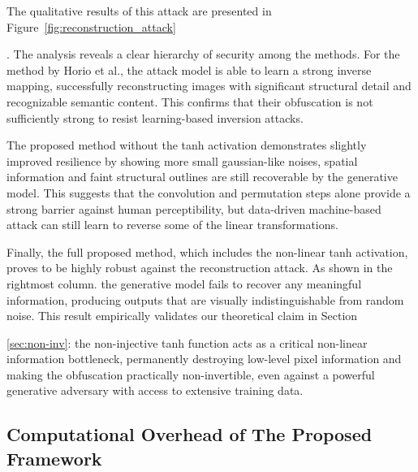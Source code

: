 \documentclass{ieeeaccess}
\begin{document}
{The qualitative results of this attack are presented in Figure~}\ref{fig:reconstruction_attack}{. The analysis reveals a clear hierarchy of security among the methods. For the method by Horio et al., the attack model is able to learn a strong inverse mapping, successfully reconstructing images with significant structural detail and recognizable semantic content. This confirms that their obfuscation is not sufficiently strong to resist learning-based inversion attacks.

The proposed method without the tanh activation demonstrates slightly improved resilience by showing more small gaussian-like noises, spatial information and faint structural outlines are still recoverable by the generative model. This suggests that the convolution and permutation steps alone provide a strong barrier against human perceptibility, but data-driven machine-based attack can still learn to reverse some of the linear transformations.

Finally, the full proposed method, which includes the non-linear tanh activation, proves to be highly robust against the reconstruction attack. As shown in the rightmost column. the generative model fails to recover any meaningful information, producing outputs that are visually indistinguishable from random noise. This result empirically validates our theoretical claim in Section~}\ref{sec:non-inv}{: the non-injective tanh function acts as a critical non-linear information bottleneck, permanently destroying low-level pixel information and making the obfuscation practically non-invertible, even against a powerful generative adversary with access to extensive training data.}


\subsection{Computational Overhead of The Proposed Framework}
\end{document}
